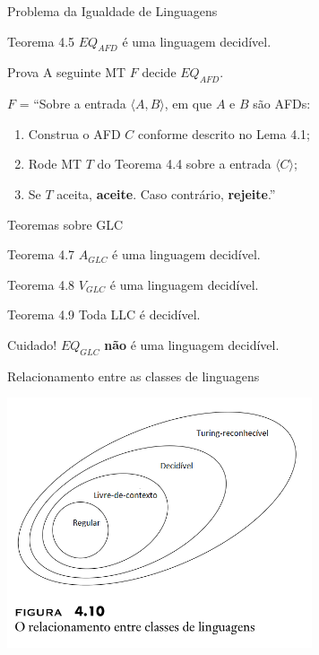 \documentclass[xcolor=dvipsnames,table]{beamer}
\begin{document}
	\begin{frame}{Problema da Igualdade de Linguagens}
		\begin{block}{Teorema 4.5}
			$EQ_{AFD}$ é uma linguagem decidível.
		\end{block}
		\begin{block}{Prova}
			A seguinte MT $F$ decide $EQ_{AFD}$.
			
			$F$ = ``Sobre a entrada $\langle A, B \rangle$, em que $A$ e $B$ são AFDs:
			\begin{enumerate}
				\item Construa o AFD $C$ conforme descrito no Lema 4.1;
				\item Rode MT $T$ do Teorema 4.4 sobre a entrada $\langle C \rangle$;
				\item Se $T$ aceita, {\bf aceite}. Caso contrário, {\bf rejeite}.''
			\end{enumerate}
		\end{block}
	\end{frame}
	
	\begin{frame}{Teoremas sobre GLC}
		\begin{block}{Teorema 4.7}
			$A_{GLC}$ é uma linguagem decidível.
		\end{block}
		\begin{block}{Teorema 4.8}
			$V_{GLC}$ é uma linguagem decidível.
		\end{block}
		\begin{block}{Teorema 4.9}
			Toda LLC é decidível.
		\end{block}
		\begin{alertblock}{Cuidado!}
			$EQ_{GLC}$ {\color{red} {\bf não}} é uma linguagem decidível.
		\end{alertblock}
	\end{frame}
	
	\begin{frame}{Relacionamento entre as classes de linguagens}
		\begin{center}
    		\includegraphics[width=9cm]{images/fig410.png}
  		\end{center}
	\end{frame}
	
\end{document}
